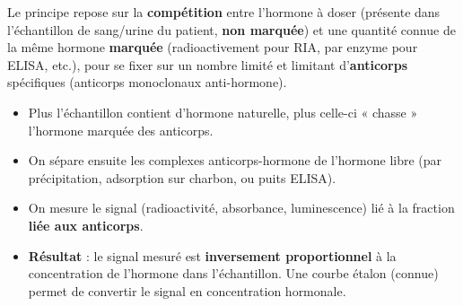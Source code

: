 \documentclass[11pt]{article}
\begin{document}
\begin{definition}
Le principe repose sur la \textbf{compétition} entre l'hormone à doser (présente dans l'échantillon de sang/urine du patient, \textbf{non marquée}) et une quantité connue de la même hormone \textbf{marquée} (radioactivement pour RIA, par enzyme pour ELISA, etc.), pour se fixer sur un nombre limité et limitant d'\textbf{anticorps} spécifiques (anticorps monoclonaux anti-hormone).
\begin{itemize}
\item Plus l'échantillon contient d'hormone naturelle, plus celle-ci « chasse » l'hormone marquée des anticorps.
\item On sépare ensuite les complexes anticorps-hormone de l'hormone libre (par précipitation, adsorption sur charbon, ou puits ELISA).
\item On mesure le signal (radioactivité, absorbance, luminescence) lié à la fraction \textbf{liée aux anticorps}.
\item \textbf{Résultat} : le signal mesuré est \textbf{inversement proportionnel} à la concentration de l'hormone dans l'échantillon. Une courbe étalon (connue) permet de convertir le signal en concentration hormonale.
\end{itemize}
\end{definition}
\end{document}
